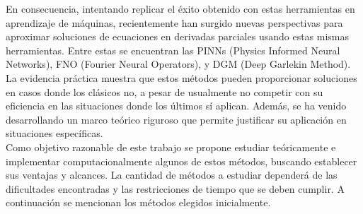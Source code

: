\documentclass[a4paper,11pt]{scrartcl}
\begin{document}
	En consecuencia, intentando replicar el éxito obtenido con estas herramientas en aprendizaje de máquinas, recientemente han surgido nuevas perspectivas para aproximar soluciones de ecuaciones en derivadas parciales usando estas mismas herramientas. Entre estas se encuentran las PINNs (Physics Informed Neural Networks)\cite{PINNs,PINNS2}, FNO (Fourier Neural Operators)\cite{li_fourier_2021}, y DGM (Deep Garlekin Method)\cite{sirignano_dgm_2018}. La evidencia práctica muestra que estos métodos pueden proporcionar soluciones en casos donde los clásicos no\cite{cuomo_scientific_2022,blechschmidt_three_2021}, a pesar de usualmente no competir con su eficiencia en las situaciones donde los últimos sí aplican. Además, se ha venido desarrollando un marco teórico riguroso que permite justificar su aplicación en situaciones específicas.  \\
	
	Como objetivo razonable de este trabajo se propone estudiar teóricamente e implementar computacionalmente algunos de estos métodos, buscando establecer sus ventajas y alcances. La cantidad de métodos a estudiar dependerá de las dificultades encontradas y las restricciones de tiempo que se deben cumplir. A continuación se mencionan los métodos elegidos inicialmente.\\
	
\end{document}
